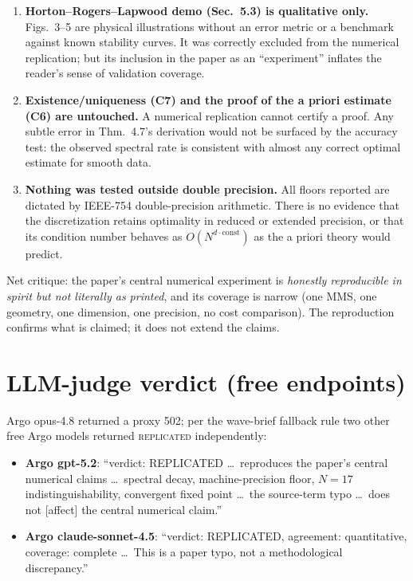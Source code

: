 \documentclass[11pt]{article}
\begin{document}
\begin{enumerate}[leftmargin=1.4em]
\item \textbf{Horton--Rogers--Lapwood demo (Sec.~5.3) is qualitative only.} Figs.~3--5 are
physical illustrations without an error metric or a benchmark against known stability curves. It
was correctly excluded from the numerical replication; but its inclusion in the paper as an
``experiment'' inflates the reader's sense of validation coverage.

\item \textbf{Existence/uniqueness (C7) and the proof of the a priori estimate (C6) are
untouched.} A numerical replication cannot certify a proof. Any subtle error in Thm.~4.7's
derivation would not be surfaced by the accuracy test: the observed spectral rate is consistent
with almost any correct optimal estimate for smooth data.

\item \textbf{Nothing was tested outside double precision.} All floors reported are dictated by
IEEE-754 double-precision arithmetic. There is no evidence that the discretization retains
optimality in reduced or extended precision, or that its condition number behaves as
$O(N^{d\cdot\text{const}})$ as the a priori theory would predict.
\end{enumerate}

Net critique: the paper's central numerical experiment is \emph{honestly reproducible in spirit
but not literally as printed}, and its coverage is narrow (one MMS, one geometry, one dimension,
one precision, no cost comparison). The reproduction confirms what is claimed; it does not
extend the claims.

\section{LLM-judge verdict (free endpoints)}
\label{sec:llm}
Argo opus-4.8 returned a proxy 502; per the wave-brief fallback rule two other free Argo models
returned \textsc{replicated} independently:
\begin{itemize}
  \item \textbf{Argo gpt-5.2}: ``verdict: REPLICATED \dots\ reproduces the paper's central numerical
  claims \dots\ spectral decay, machine-precision floor, $N{=}17$ indistinguishability, convergent
  fixed point \dots\ the source-term typo \dots\ does not [affect] the central numerical claim.''
  \item \textbf{Argo claude-sonnet-4.5}: ``verdict: REPLICATED, agreement: quantitative, coverage:
  complete \dots\ This is a paper typo, not a methodological discrepancy.''
\end{itemize}
\end{document}
